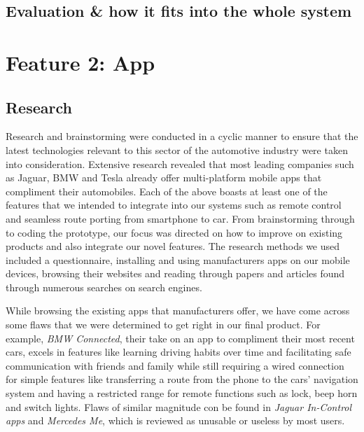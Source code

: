 \documentclass{article}
\begin{document}

\subsection{Evaluation \& how it fits into the whole system}\label{ssec:nav-evaluation}

%
%
\section{Feature 2: App}\label{sec:app}

\subsection{Research}\label{ssec:app-research}
Research and brainstorming were conducted in a cyclic manner to ensure that the latest technologies relevant to this sector of the automotive industry were taken into consideration. Extensive research revealed that most leading companies such as Jaguar, BMW and Tesla already offer multi-platform mobile apps that compliment their automobiles. Each of the above boasts at least one of the features that we intended to integrate into our systems such as remote control and seamless route porting from smartphone to car. From brainstorming through to coding the prototype, our focus was directed on how to improve on existing products and also integrate our novel features.
The research methods we used included a questionnaire, installing and using manufacturers apps on our mobile devices, browsing their websites and reading through papers and articles found through numerous searches on search engines.

While browsing the existing apps that manufacturers offer, we have come across some flaws that  we were determined to get right in our final product. For example, \textit{BMW Connected}, their take on an app to compliment their most recent cars, excels in features like learning driving habits over time and facilitating safe communication with friends and family while still requiring a wired connection for simple features like transferring a route from the phone to the cars' navigation system and having a restricted range for remote functions such as lock, beep horn and switch lights. Flaws of similar magnitude con be found in \textit{Jaguar In-Control apps} and \textit{Mercedes Me}, which is reviewed as unusable or useless by most users.
\end{document}
